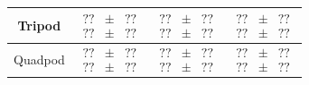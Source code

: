 \documentclass[conference]{IEEEtran}
\begin{document}
\begin{table}
\begin{center}
\begin{tabular}[c]{cccc}
        \midrule
        Tripod & $\begin{matrix}??\\??\end{matrix} \begin{matrix}\pm\\\pm\end{matrix} \begin{matrix}??\\ ??\end{matrix}$ & $\begin{matrix}??\\??\end{matrix} \begin{matrix}\pm\\\pm\end{matrix} \begin{matrix}??\\ ??\end{matrix}$ & $\begin{matrix}??\\??\end{matrix} \begin{matrix}\pm\\\pm\end{matrix} \begin{matrix}??\\??\end{matrix}$ \\
        \midrule
        Quadpod & $\begin{matrix}??\\??\end{matrix} \begin{matrix}\pm\\\pm\end{matrix} \begin{matrix}??\\ ??\end{matrix}$ & $\begin{matrix}??\\??\end{matrix} \begin{matrix}\pm\\\pm\end{matrix} \begin{matrix}??\\ ??\end{matrix}$ & $\begin{matrix}??\\??\end{matrix} \begin{matrix}\pm\\\pm\end{matrix} \begin{matrix}??\\??\end{matrix}$ \\

\end{tabular}
\end{center}
\end{table}
\end{document}
